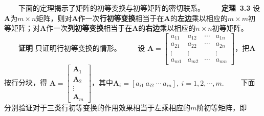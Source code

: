 \documentclass[compress,mathserif,cjk]{beamer}
\theoremstyle{remark}
\numberwithin{equation}{section}
\newcommand{\hei}{\bf}      %
\begin{document}
\begin{CJK}{UTF8}{gbsn}
\begin{frame}
 \ \ \ \ 下面的定理揭示了矩阵的初等变换与初等矩阵的密切联系。
 \vskip 5pt
 \ \ \ \ {\hei 定理~3.3} 设$\bm A$为$m\times n$矩阵，则对$\bm A$作一次{\hei 行初等变换}相当于在$\bm A$的{\hei 左边}乘以相应的$m\times m$初等矩阵；对$\bm A$作一次{\hei 列初等变换}相当于在$\bm A$的{\hei 右边}乘以相应的$n\times n$初等矩阵。
 \pause\vskip 5pt
 \ \ \ \ {\hei 证明} 只证明行初等变换的情形。
 \vskip 5pt
 \ \ \ \ 设
 $\bm A=\left[\begin{matrix}a_{11}&a_{12}&\cdots&a_{1n}\\a_{21}&a_{22}&\cdots&a_{2n}\\ \vdots&\vdots&&\vdots\\a_{m1}&a_{m2}&\cdots&a_{mn}\end{matrix}\right]$，把$\bm A$按行分块，得
 $\bm A=\left[\begin{matrix}\bm A_1\\\bm A_2\\\vdots\\\bm A_m\end{matrix}\right]$，其中$\bm A_i=[a_{i1}~a_{i2}~\cdots~a_{in}],~i=1,2,\cdots,m.$
 \vskip 5pt
 \ \ \ \ 下面分别验证对于三类行初等变换的作用效果相当于左乘相应的$m$阶初等矩阵，即
\end{frame}


\end{CJK}
\end{document}
